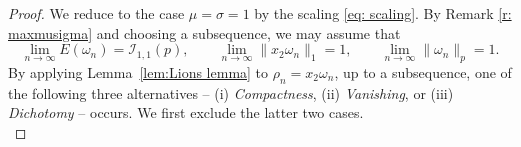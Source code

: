 \documentclass[11pt]{amsart}
\theoremstyle{definition}
\theoremstyle{definition}
\numberwithin{equation}{section}
\newcommand{\0}{\emptyset}
\newcommand{\calI}{\mathcal I}
\begin{document}
			
			\begin{proof}
				We reduce to the case $\mu=\sigma=1$ by the scaling \eqref{eq: scaling}. By Remark \ref{r: maxmusigma} and choosing a subsequence, we may assume that   
				\begin{equation}
					\label{eq_stab_energy-red}
					{\lim_{n \to \infty} E(\omega_n) = \calI_{1,1}(p), \qquad \lim_{n \to \infty}     \|x_2 \omega_n\|_1 = 1, \qquad \lim_{n \to \infty} \|\omega_n\|_p = 1.}
				\end{equation} 
				By applying Lemma~\ref{lem:Lions lemma} to $\rho_n=x_2\omega_n$, up to a subsequence, one of the following three alternatives -- (i) \textit{Compactness}, (ii) \textit{Vanishing}, or (iii) \textit{Dichotomy} -- occurs. We first exclude the latter two cases.\\
				

\end{proof}
\end{document}
